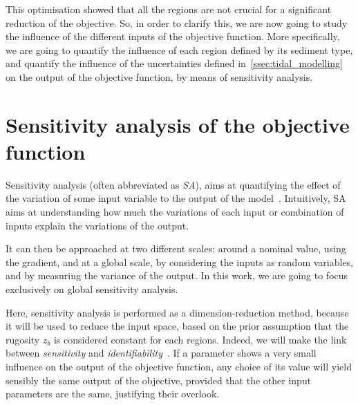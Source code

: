 \documentclass[../../Main_ManuscritThese.tex]{subfiles}
\newcommand{\zob}{z_b}
\begin{document}
This optimisation showed that all the regions are not crucial for a
significant reduction of the objective. So, in order to clarify this,
we are now going to study the influence of the different inputs of the
objective function. More specifically, we are going to quantify the
influence of each region defined by its sediment type, and quantify
the influence of the uncertainties defined
in~\cref{ssec:tidal_modelling} on the output of the objective
function, by means of sensitivity analysis.

\section{Sensitivity analysis of the objective function}
\label{sec:sensitivity-analysis}
Sensitivity analysis (often abbreviated as \emph{SA}), aims at
quantifying the effect of the variation of some input variable to the
output of the model~\citep{iooss_revue_2011,janon_analyse_2012}.
Intuitively, SA aims at understanding how much the variations
of each input or combination of inputs explain the variations of the
output.

It can then be approached at two different scales:
around a nominal value, using the gradient, and at a global scale, by
considering the inputs as random variables, and by measuring the
variance of the output. In this work, we are going to focus
exclusively on global sensitivity analysis.

Here, sensitivity analysis is performed as a dimension-reduction
method, because it will be used to reduce the input space, based on
the prior assumption that the rugosity $\zob$ is considered constant
for each regions. Indeed, we will make the link between
\emph{sensitivity} and
\emph{identifiability}~\citep{dobre_global_2010}. %
If a parameter shows a very small influence on the output of the
objective function, any choice of its value will yield sensibly the
same output of the objective, provided that the other input parameters
are the same, justifying their overlook.
\end{document}
